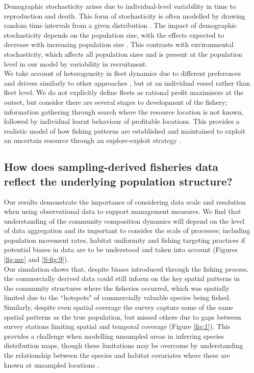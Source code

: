 \documentclass[review]{elsarticle}
\begin{document}
Demographic stochasticity arises due to individual-level variability in time to
reproduction and death. This form of stochasticity is often modelled by drawing
random time intervals from a given distribution \citep{Gillespie1977}. The
impact of demographic stochasticity depends on the population size, with the
effects expected to decrease with increasing population size \citep{Lande2010}.
This contrasts with environmental stochasticity, which affects all population
sizes and is present at the population level in our model by variability in
recruitment. \\

We take account of heterogeneity in fleet dynamics due to different preferences
and drivers similarly to other approaches \citep{Fulton2011}, but at an
individual vessel rather than fleet level. We do not explicitly define fleets
as rational profit maximisers at the outset, but consider there are several
stages to development of the fishery; information gathering through search
where the resource location is not known, followed by individual learnt
behaviour of profitable locations.  This provides a realistic model of how
fishing patterns are established and maintained to exploit an uncertain
resource through an explore-exploit strategy \citep{Mangel1983, Bailey2018}. 

\subsection{How does sampling-derived fisheries data reflect the underlying
	population structure?}


Our results demonstrate the importance of considering data scale and resolution
when using observational data to support management measures. We find that
understanding of the community composition dynamics will depend on the level of
data aggregation and its important to consider the scale of processes;
including population movement rates, habitat uniformity and fishing targeting
practices if potential biases in data are to be understood and taken into
account (Figures \ref{fig:mv} and \ref{S-fig:9}). \\

Our simulation shows that, despite biases introduced through the fishing
process, the commercially derived data could still inform on the key spatial
patterns in the community structures where the fisheries occurred, which was
spatially limited due to the ``hotspots" of commercially valuable species being
fished. Similarly, despite even spatial coverage the survey capture some of the same spatial patterns as the true population, but missed
others due to gaps between survey stations limiting spatial and temporal
coverage (Figure \ref{fig:1}). This provides a challenge when
modelling unsampled areas in inferring species distribution maps, though these
limitations may be overcome by understanding the relationship between the
species and habitat covariates where these are known at unsampled locations
\citep{Robinson2011}. \\ 
\end{document}
